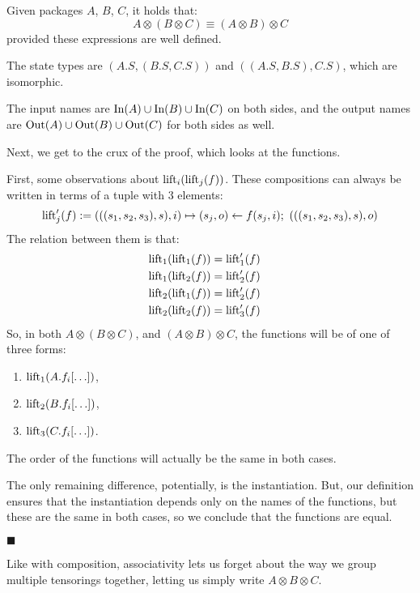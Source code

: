 \begin{lemma}
    Given packages $A$, $B$, $C$, it holds that:
    $$
    A \otimes (B \otimes C) \equiv (A \otimes B) \otimes C
    $$
    provided these expressions are well defined.

     The state types are $(A.S, (B.S, C.S))$
    and $((A.S, B.S), C.S)$, which are isomorphic.

    The input names are $\text{In}(A) \cup \text{In}(B) \cup \text{In}(C)$
    on both sides,
    and the output names are $\text{Out}(A) \cup \text{Out}(B) \cup \text{Out}(C)$
    for both sides as well.

    Next, we get to the crux of the proof, which looks at the functions.

    First, some observations about $\text{lift}_{i}(\text{lift}_j(f))$.
    These compositions can always be written in terms of a tuple with
    3 elements:
    $$
    \text{lift}'_j(f) := (((s_1, s_2, s_3), s), i) \mapsto (s_j, o) \gets f(s_j, i);\ (((s_1, s_2, s_3), s), o)
    $$
    The relation between them is that:
    $$
    \begin{aligned}
    &\text{lift}_1(\text{lift}_1(f)) = \text{lift}'_1(f)\cr
    &\text{lift}_1(\text{lift}_2(f)) = \text{lift}'_2(f)\cr
    &\text{lift}_2(\text{lift}_1(f)) = \text{lift}'_2(f)\cr
    &\text{lift}_2(\text{lift}_2(f)) = \text{lift}'_3(f)\cr
    \end{aligned}
    $$
    So, in both $A \otimes (B \otimes C)$, and $(A \otimes B) \otimes C$, the functions will be of one of three forms:
    \begin{enumerate}
        \item $\text{lift}_1(A.f_i[\ldots])$,
        \item $\text{lift}_2(B.f_i[\ldots])$,
        \item $\text{lift}_3(C.f_i[\ldots])$.
    \end{enumerate}

    The order of the functions will actually be the same in both cases.

    The only remaining difference, potentially, is the instantiation.
    But, our definition ensures that the instantiation depends only on the names
    of the functions, but these are the same in both cases,
    so we conclude that the functions are equal.

    $\blacksquare$
\end{lemma}

Like with composition, associativity lets us forget about the way we
group multiple tensorings together, letting us simply write $A \otimes B \otimes C$.

